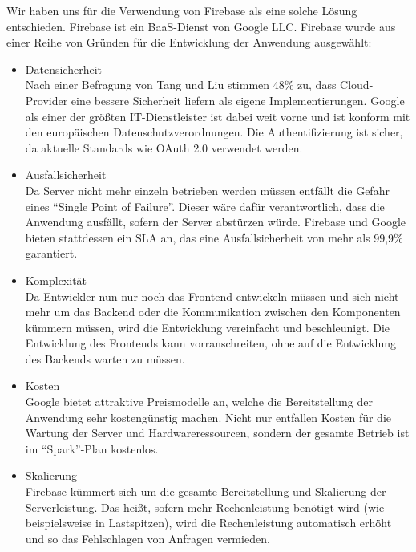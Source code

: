 Wir haben uns für die Verwendung von Firebase als eine solche Lösung entschieden.
Firebase ist ein \ac{BaaS}-Dienst von Google LLC.
Firebase wurde aus einer Reihe von Gründen für die Entwicklung der Anwendung ausgewählt:
\begin{itemize}
    \item Datensicherheit\\
        Nach einer Befragung von Tang und Liu stimmen 48\% zu, dass Cloud-Provider eine bessere Sicherheit liefern als eigene Implementierungen.\autocite[S. 63]{TANG}
        Google als einer der größten IT-Dienstleister ist dabei weit vorne und ist konform mit den europäischen Datenschutzverordnungen.\autocite{firebaseDataprotection}
        Die Authentifizierung ist sicher, da aktuelle Standards wie OAuth 2.0 verwendet werden.
    \item Ausfallsicherheit\\
        Da Server nicht mehr einzeln betrieben werden müssen entfällt die Gefahr eines \enquote{Single Point of Failure}. 
        Dieser wäre dafür verantwortlich, dass die Anwendung ausfällt, sofern der Server abstürzen würde.
        Firebase und Google bieten stattdessen ein \ac{SLA} an, das eine Ausfallsicherheit von mehr als 99,9\% garantiert.\autocite{firebaseSLA}
    \item Komplexität\\
        Da Entwickler nun nur noch das Frontend entwickeln müssen und sich nicht mehr um das Backend oder die Kommunikation zwischen den Komponenten kümmern müssen, wird die Entwicklung vereinfacht und beschleunigt.
        Die Entwicklung des Frontends kann vorranschreiten, ohne auf die Entwicklung des Backends warten zu müssen.
    \item Kosten \\
        Google bietet attraktive Preismodelle an, welche die Bereitstellung der Anwendung sehr kostengünstig machen.
        Nicht nur entfallen Kosten für die Wartung der Server und Hardwareressourcen, sondern der gesamte Betrieb ist im \enquote{Spark}-Plan kostenlos.
    \item Skalierung \\
        Firebase kümmert sich um die gesamte Bereitstellung und Skalierung der Serverleistung.
        Das heißt, sofern mehr Rechenleistung benötigt wird (wie beispielsweise in Lastspitzen), wird die Rechenleistung automatisch erhöht und so das Fehlschlagen von Anfragen vermieden.
\end{itemize}




















